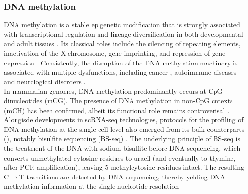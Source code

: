 \subsubsection{DNA methylation} \label{section:dna_methylation}
DNA methylation is a stable epigenetic modification that is strongly associated with transcriptional regulation and lineage diversification in both developmental and adult tissues \cite{Jin2018, Harrison2011, Lee2014, Smith2013}. Its classical roles include the silencing of repeating elements, inactivation of the X chromosome, gene imprinting, and repression of gene expression \cite{Jones2012}. Consistently, the disruption of the DNA methylation machinery is associated with multiple dysfunctions, including cancer \cite{Baylin2011}, autoimmune diseases \cite{Liu2013} and neurological disorders \cite{Amir1999}.\\
In mammalian genomes, DNA methylation predominantly occurs at CpG dinucleotides (mCG). The presence of DNA methylation in non-CpG cntexts (mCH) has been confirmed, albeit its functional role remains controverisal \cite{He2015, Ramsahoye2000, Lister2009}.\\

Alongisde developments in scRNA-seq technologies, protocols for the profiling of DNA methylation at the single-cell level also emerged from its bulk counterparts (), notably bisulfite sequencing (BS-seq) \cite{Smallwood2014,Guo2013,Gravina2016,Farlik2015}. The underlying principle of BS-seq is the treatment of the DNA with sodium bisulfite before DNA sequencing, which converts unmethylated cytosine residues to uracil (and eventually to thymine, after PCR amplification), leaving 5-methylcytosine residues intact. The resulting C$\to$T transitions are detected by DNA sequencing, thereby yelding DNA methylation information at the single-nucleotide resolution \cite{Frommer1992,Clark2016,Clark2017}.\\

